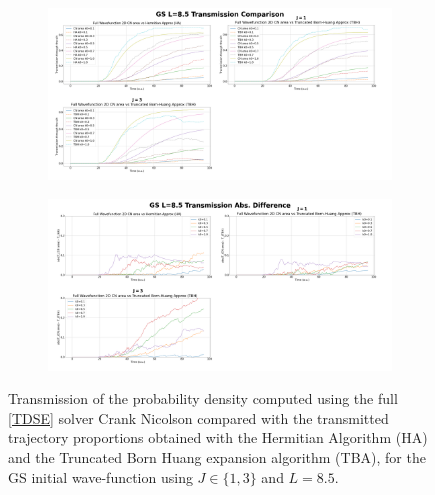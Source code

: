 \documentclass[11pt, a4paper]{article} %
\begin{document}
\begin{figure}[p]
  \centering
  \begin{subfigure}[b]{1.1\linewidth}
    \includegraphics[width=\linewidth]{Example_Results/GS_L_8.5_transmission.png}
  \end{subfigure}
  \begin{subfigure}[b]{1.1\linewidth}
    \includegraphics[width=\linewidth]{Example_Results/GS_L_8.5_errors.png}
  \end{subfigure}

  
  \caption{ Transmission of the probability density computed using the full \ref{TDSE} solver Crank Nicolson compared with the transmitted trajectory proportions obtained with the Hermitian Algorithm (HA) and the Truncated Born Huang expansion algorithm (TBA), for the GS initial wave-function using $J\in\{1,3\}$ and $L=8.5$. }
  \label{fig:transm_GS_L85}
\end{figure}
\end{document}
